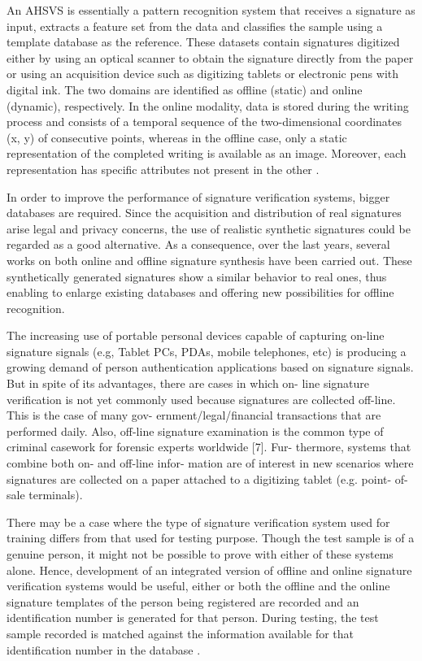 An AHSVS is essentially a pattern recognition system that receives a signature as input, extracts a feature set from the data and classifies the sample using a template database as the reference. These datasets contain signatures digitized either by using an optical scanner to obtain the signature directly from the paper or using an acquisition device such as digitizing tablets or electronic pens with digital ink. The two domains are identified as offline (static) and online (dynamic), respectively.  In the online modality, data is stored during the writing process and consists of a temporal sequence of the two-dimensional coordinates (x, y) of consecutive points, whereas in the offline case, only a static representation of the completed writing is available as an image. Moreover, each representation has specific attributes not present in the other \cite{viard1999ireste}. 

In order to improve the performance of signature verification systems, bigger databases are required. Since the acquisition and distribution of real signatures arise legal and privacy concerns, the use of realistic synthetic signatures could be regarded as a good alternative. As a consequence, over the last years, several works on both online \cite{galbally2009synthetic, galbally2012synthetic} and offline \cite{ferrer2013synthetic, ferrer2013realistic} signature synthesis have been carried out. These synthetically generated signatures show a similar behavior to real ones, thus enabling to enlarge existing databases and offering new possibilities for offline recognition.

The increasing use of portable personal devices capable
of capturing on-line signature signals (e.g, Tablet PCs, PDAs,
mobile telephones, etc) is producing a growing demand of
person authentication applications based on signature signals.
But in spite of its advantages, there are cases in which on-
line signature verification is not yet commonly used because
signatures are collected off-line. This is the case of many gov-
ernment/legal/financial transactions that are performed daily.
Also, off-line signature examination is the common type of
criminal casework for forensic experts worldwide [7]. Fur-
thermore, systems that combine both on- and off-line infor-
mation are of interest in new scenarios where signatures are
collected on a paper attached to a digitizing tablet (e.g. point-
of-sale terminals).


There may be a case where the type of signature verification system used for training differs from that used for testing purpose. Though the test sample is of a genuine person, it might not be possible to prove with either of these systems alone. Hence, development of an integrated version of offline and online signature verification systems would be useful, either or both the offline and the online signature templates of the person being registered are recorded and an identification number is generated for that person. During testing, the test sample recorded is matched against the information available for that identification number in the database \cite{uppalapati2007integration}.

